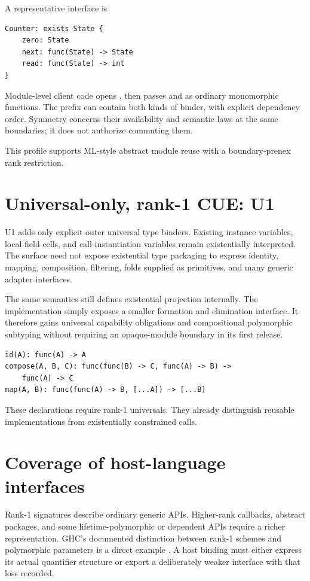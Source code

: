 \documentclass[11pt,a4paper,oneside]{report}
\newcommand{\code}[1]{\texttt{\detokenize{#1}}}
\newcommand{\Uone}{\ensuremath{\profilecal{U}_{1}}}
\def\Uone{U1}%
\theoremstyle{remark}
\newcounter{example}[chapter]
\begin{document}
A representative interface is
\par\noindent\begin{minipage}{\linewidth}
\begin{lstlisting}
Counter: exists State {
    zero: State
    next: func(State) -> State
    read: func(State) -> int
}
\end{lstlisting}
\end{minipage}\par
Module-level client code opens \code{Counter}, then passes \code{next} and
\code{read} as ordinary monomorphic functions. The prefix can contain both kinds
of binder, with explicit dependency order. Symmetry concerns their availability
and semantic laws at the same boundaries; it does not authorize commuting them.

This profile supports ML-style abstract module reuse with a boundary-prenex
rank restriction.

\section{Universal-only, rank-1 CUE: \Uone{}}
\Uone{} adds only explicit outer universal type binders. Existing instance variables,
local field cells, and call-instantiation variables remain existentially
interpreted. The surface need not expose existential type packaging to express
identity, mapping, composition, filtering, folds supplied as primitives, and
many generic adapter interfaces.

The same semantics still defines existential projection internally. The
implementation simply exposes a smaller formation and elimination interface.
It therefore gains universal capability obligations and compositional
polymorphic subtyping without requiring an opaque-module boundary in its first
release.

\par\noindent\begin{minipage}{\linewidth}
\begin{lstlisting}
id(A): func(A) -> A
compose(A, B, C): func(func(B) -> C, func(A) -> B) ->
    func(A) -> C
map(A, B): func(func(A) -> B, [...A]) -> [...B]
\end{lstlisting}
\end{minipage}\par
These declarations require rank-1 universals. They already distinguish reusable
implementations from existentially constrained calls.

\section{Coverage of host-language interfaces}
Rank-1 signatures describe ordinary generic APIs. Higher-rank callbacks,
abstract packages, and some lifetime-polymorphic or dependent APIs require a
richer representation.
GHC's documented distinction between rank-1 schemes and polymorphic parameters
is a direct example \cite{ghcrank}. A host binding must either express its actual
quantifier structure or export a deliberately weaker interface with that loss
recorded.
\end{document}
